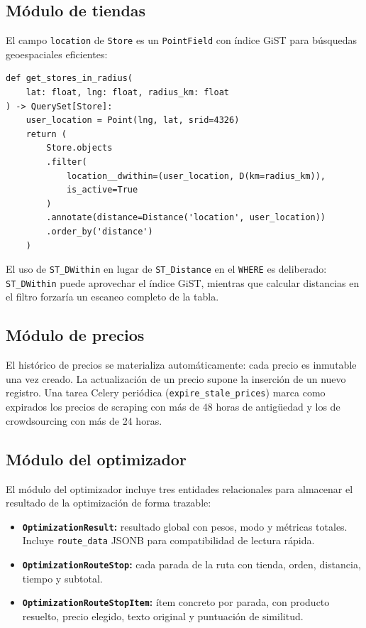 \subsection{M\'odulo de tiendas}\label{subsec:modelo-tiendas}

El campo \texttt{location} de \texttt{Store} es un \texttt{PointField} con \'indice GiST para
b\'usquedas geoespaciales eficientes:

\begin{verbatim}
def get_stores_in_radius(
    lat: float, lng: float, radius_km: float
) -> QuerySet[Store]:
    user_location = Point(lng, lat, srid=4326)
    return (
        Store.objects
        .filter(
            location__dwithin=(user_location, D(km=radius_km)),
            is_active=True
        )
        .annotate(distance=Distance('location', user_location))
        .order_by('distance')
    )
\end{verbatim}

El uso de \texttt{ST\_DWithin} en lugar de \texttt{ST\_Distance} en el \texttt{WHERE} es
deliberado: \texttt{ST\_DWithin} puede aprovechar el \'indice GiST, mientras que calcular
distancias en el filtro forzar\'ia un escaneo completo de la tabla.

\subsection{M\'odulo de precios}\label{subsec:modelo-precios}

El hist\'orico de precios se materializa autom\'aticamente: cada precio es inmutable una vez
creado. La actualizaci\'on de un precio supone la inserci\'on de un nuevo registro. Una tarea
Celery peri\'odica (\texttt{expire\_stale\_prices}) marca como expirados los precios de scraping
con m\'as de 48 horas de antig\"uedad y los de crowdsourcing con m\'as de 24 horas.

\subsection{M\'odulo del optimizador}\label{subsec:modelo-optimizador}

El m\'odulo del optimizador incluye tres entidades relacionales para almacenar el resultado de la
optimizaci\'on de forma trazable:

\begin{itemize}
  \item \textbf{\texttt{OptimizationResult}:} resultado global con pesos, modo y m\'etricas
    totales. Incluye \texttt{route\_data} JSONB para compatibilidad de lectura r\'apida.
  \item \textbf{\texttt{OptimizationRouteStop}:} cada parada de la ruta con tienda, orden,
    distancia, tiempo y subtotal.
  \item \textbf{\texttt{OptimizationRouteStopItem}:} \'item concreto por parada, con producto
    resuelto, precio elegido, texto original y puntuaci\'on de similitud.
\end{itemize}

